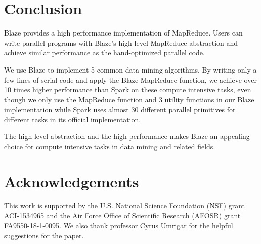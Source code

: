 \section{Conclusion}
\label{sec:con}
Blaze provides a high performance implementation of MapReduce.
Users can write parallel programs with Blaze's high-level MapReduce abstraction and achieve similar performance as the hand-optimized parallel code.

We use Blaze to implement 5 common data mining algorithms.
By writing only a few lines of serial code and apply the Blaze MapReduce function, we achieve over 10 times higher performance than Spark on these compute intensive tasks, even though we only use the MapReduce function and 3 utility functions in our Blaze implementation while Spark uses almost 30 different parallel primitives for different tasks in its official implementation.
 
The high-level abstraction and the high performance makes Blaze an appealing choice for compute intensive tasks in data mining and related fields.


\section{Acknowledgements}
This work is supported by the U.S. National Science Foundation (NSF) grant ACI-1534965 and the Air Force Office of Scientific Research (AFOSR) grant FA9550-18-1-0095.
We also thank professor Cyrus Umrigar for the helpful suggestions for the paper.

